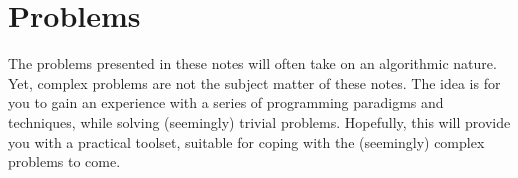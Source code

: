 \section{Problems}

The problems presented in these notes will often take on an algorithmic nature.
Yet, complex problems are not the subject matter of these notes. The idea is
for you to gain an experience with a series of programming paradigms and
techniques, while solving (seemingly) trivial problems.  Hopefully, this will
provide you with a practical toolset, suitable for coping with the (seemingly)
complex problems to come.

